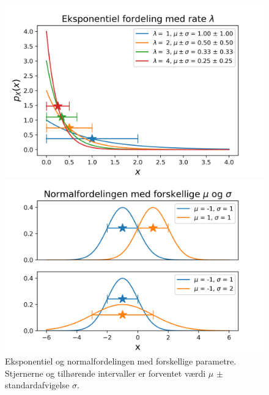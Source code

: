 \begin{figure}
\centering
\begin{minipage}[b][][b]{.45\textwidth}
\centering
\includegraphics[width = \textwidth]{exp_dist.png}
\end{minipage}
\begin{minipage}[b][][b]{.45\textwidth}
\centering
\includegraphics[width = \textwidth]{normal.png}
\end{minipage}
\caption{Eksponentiel og normalfordelingen med forskellige parametre. Stjernerne og tilhørende intervaller er forventet værdi $\mu$ $\pm$ standardafvigelse $\sigma$.} \label{fig:expnorm}
\end{figure}
